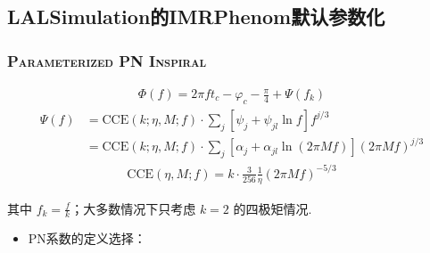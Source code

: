 \documentclass[CJK,aspectratio=169]{beamer}  %
\begin{document}
\subsection{LALSimulation的IMRPhenom默认参数化}
\begin{frame}[allowframebreaks]
	\frametitle{\textsc{Parameterized PN Inspiral}}

	\begin{align}
		\Phi(f) = 2\pi ft_c - \varphi_c - \frac{\pi}{4} + \Psi(f_k)
	\end{align}
	\begin{align}
		\Psi(f) &= \text{CCE}(k;\eta,M;f) \cdot \sum_j \left[ \psi_j + \psi_{jl} \ln{f} \right] f^{j/3}\\
				&= \text{CCE}(k;\eta,M;f) \cdot \sum_j \left[ \alpha_j + \alpha_{jl} \ln{(2\pi Mf)} \right] (2\pi Mf)^{j/3}
	\end{align}
	\begin{align}
		\text{CCE}(\eta,M;f) = k \cdot \frac{3}{256}\frac{1}{\eta}(2\pi Mf)^{-5/3}
	\end{align}
	\par 其中 $f_k = \frac{f}{k}$；大多数情况下只考虑 $k = 2$ 的四极矩情况.

	\begin{itemize}
		\item[1. ] PN系数的定义选择：
		


\end{itemize}
\end{frame}
\end{document}
